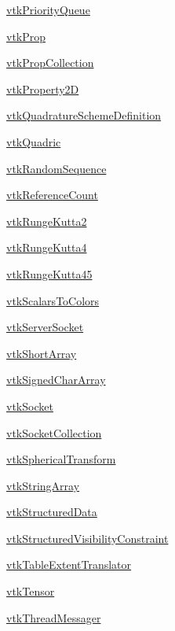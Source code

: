 \begin{DoxyItemize}
\item \hyperlink{vtkcommon_vtkpriorityqueue}{vtk\-Priority\-Queue}  
\item \hyperlink{vtkcommon_vtkprop}{vtk\-Prop}  
\item \hyperlink{vtkcommon_vtkpropcollection}{vtk\-Prop\-Collection}  
\item \hyperlink{vtkcommon_vtkproperty2d}{vtk\-Property2\-D}  
\item \hyperlink{vtkcommon_vtkquadratureschemedefinition}{vtk\-Quadrature\-Scheme\-Definition}  
\item \hyperlink{vtkcommon_vtkquadric}{vtk\-Quadric}  
\item \hyperlink{vtkcommon_vtkrandomsequence}{vtk\-Random\-Sequence}  
\item \hyperlink{vtkcommon_vtkreferencecount}{vtk\-Reference\-Count}  
\item \hyperlink{vtkcommon_vtkrungekutta2}{vtk\-Runge\-Kutta2}  
\item \hyperlink{vtkcommon_vtkrungekutta4}{vtk\-Runge\-Kutta4}  
\item \hyperlink{vtkcommon_vtkrungekutta45}{vtk\-Runge\-Kutta45}  
\item \hyperlink{vtkcommon_vtkscalarstocolors}{vtk\-Scalars\-To\-Colors}  
\item \hyperlink{vtkcommon_vtkserversocket}{vtk\-Server\-Socket}  
\item \hyperlink{vtkcommon_vtkshortarray}{vtk\-Short\-Array}  
\item \hyperlink{vtkcommon_vtksignedchararray}{vtk\-Signed\-Char\-Array}  
\item \hyperlink{vtkcommon_vtksocket}{vtk\-Socket}  
\item \hyperlink{vtkcommon_vtksocketcollection}{vtk\-Socket\-Collection}  
\item \hyperlink{vtkcommon_vtksphericaltransform}{vtk\-Spherical\-Transform}  
\item \hyperlink{vtkcommon_vtkstringarray}{vtk\-String\-Array}  
\item \hyperlink{vtkcommon_vtkstructureddata}{vtk\-Structured\-Data}  
\item \hyperlink{vtkcommon_vtkstructuredvisibilityconstraint}{vtk\-Structured\-Visibility\-Constraint}  
\item \hyperlink{vtkcommon_vtktableextenttranslator}{vtk\-Table\-Extent\-Translator}  
\item \hyperlink{vtkcommon_vtktensor}{vtk\-Tensor}  
\item \hyperlink{vtkcommon_vtkthreadmessager}{vtk\-Thread\-Messager}  

\end{DoxyItemize}
